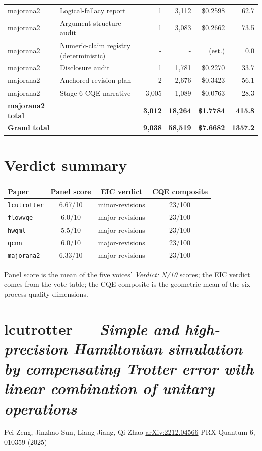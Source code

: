 \documentclass[10pt,letterpaper]{article}
\begin{document}
\begin{tabular}{llrrrr}
majorana2 & Logical-fallacy report & 1 & 3,112 & \$0.2598 & 62.7 \\
majorana2 & Argument-structure audit & 1 & 3,083 & \$0.2662 & 73.5 \\
majorana2 & Numeric-claim registry (deterministic) & - & - & (est.) & 0.0 \\
majorana2 & Disclosure audit & 1 & 1,781 & \$0.2270 & 33.7 \\
majorana2 & Anchored revision plan & 2 & 2,676 & \$0.3423 & 56.1 \\
majorana2 & Stage-6 CQE narrative & 3,005 & 1,089 & \$0.0763 & 28.3 \\
\textbf{majorana2 total} & & \textbf{3,012} & \textbf{18,264} & \textbf{\$1.7784} & \textbf{415.8} \\
\midrule
\textbf{Grand total} & & \textbf{9,038} & \textbf{58,519} & \textbf{\$7.6682} & \textbf{1357.2} \\
\bottomrule
\end{tabular}
\section{Verdict summary}
\begin{tabular}{lccc}
\toprule
Paper & Panel score & EIC verdict & CQE composite \\
\midrule
\texttt{lcutrotter} & 6.67/10 & minor-revisions & 23/100 \\
\texttt{flowvqe} & 6.0/10 & major-revisions & 23/100 \\
\texttt{hwqml} & 5.5/10 & major-revisions & 23/100 \\
\texttt{qcnn} & 6.0/10 & major-revisions & 23/100 \\
\texttt{majorana2} & 6.33/10 & major-revisions & 23/100 \\
\bottomrule
\end{tabular}

\noindent Panel score is the mean of the five voices' \emph{Verdict: N/10} scores; the EIC verdict comes from the vote table; the CQE composite is the geometric mean of the six process-quality dimensions.
\clearpage
\section{lcutrotter --- \emph{Simple and high-precision Hamiltonian simulation by compensating Trotter error with linear combination of unitary operations}}
\noindent Pei Zeng, Jinzhao Sun, Liang Jiang, Qi Zhao \quad \href{https://arxiv.org/abs/2212.04566}{arXiv:2212.04566} \quad PRX Quantum 6, 010359 (2025)
\end{document}
